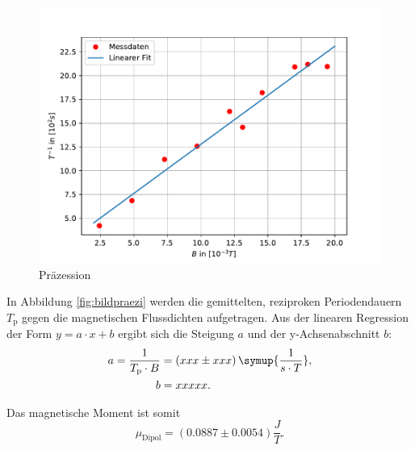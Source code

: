 \begin{figure}[h]
\centering
\includegraphics[scale=.9]{PraezessionsMethode.pdf}
\caption{Präzession}
\label{fig:bildpraezi}
\end{figure}
In Abbildung \eqref{fig:bildpraezi} werden die gemittelten, reziproken Periodendauern $T_{\text{p}}$ gegen die magnetischen 
Flussdichten aufgetragen. 
Aus der linearen Regression der Form $y=a\cdot x +b$ ergibt sich die Steigung $a$ und der y-Achsenabschnitt $b$:
\begin{equation*} 
\begin{aligned}
a = \frac{1}{T_{\text{p}} \cdot B} &= (xxx \pm xxx)\, \symup{\frac{1}{s\cdot T}}, \\
b &= xxxxx . 
\end{aligned} 
\end{equation*}

Das magnetische Moment ist somit 
\begin{equation*}
\mu_{\text{Dipol}} = (0.0887 \pm 0.0054) \frac{J}{T}.
\end{equation*}
